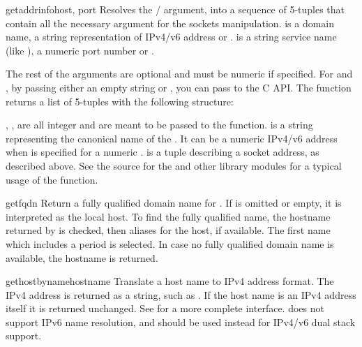 \begin{funcdesc}{getaddrinfo}{host, port}
Resolves the / argument, into a sequence of
5-tuples that contain all the necessary argument for the sockets
manipulation.  is a domain name, a string representation of
IPv4/v6 address or .
 is a string service name (like ), a numeric
port number or .

The rest of the arguments are optional and must be numeric if
specified.  For  and , by passing either an empty
string or , you can pass  to the C API.  The
 function returns a list of 5-tuples with
the following structure:


, ,  are all integer and are meant to
be passed to the  function.
 is a string representing the canonical name of the .
It can be a numeric IPv4/v6 address when  is specified
for a numeric .
 is a tuple describing a socket address, as described above.
See the source for the  and other library modules
for a typical usage of the function.
\end{funcdesc}

\begin{funcdesc}{getfqdn}{}
Return a fully qualified domain name for .
If  is omitted or empty, it is interpreted as the local
host.  To find the fully qualified name, the hostname returned by
 is checked, then aliases for the host, if
available.  The first name which includes a period is selected.  In
case no fully qualified domain name is available, the hostname is
returned.
\end{funcdesc}

\begin{funcdesc}{gethostbyname}{hostname}
Translate a host name to IPv4 address format.  The IPv4 address is
returned as a string, such as  .  If the host name
is an IPv4 address itself it is returned unchanged.  See
 for a more complete interface.
 does not support IPv6 name resolution, and
 should be used instead for IPv4/v6 dual stack support.
\end{funcdesc}

